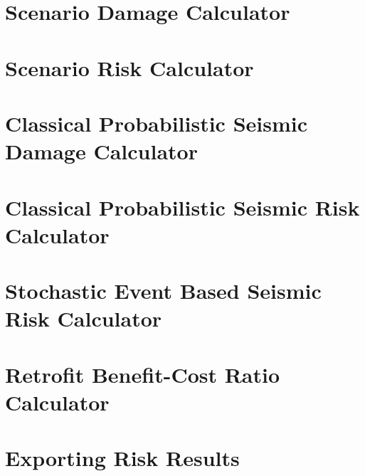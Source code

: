 \section{Scenario Damage Calculator}
\label{sec:config_scenario_damage}


\section{Scenario Risk Calculator}
\label{sec:config_scenario_risk}


\section{Classical Probabilistic Seismic Damage Calculator}
\label{sec:config_classical_damage}


\section{Classical Probabilistic Seismic Risk Calculator}
\label{sec:config_classical_risk}


\section{Stochastic Event Based Seismic Risk Calculator}
\label{sec:config_event_based_risk}


\section{Retrofit Benefit-Cost Ratio Calculator}
\label{sec:config_benefit_cost}


\section{Exporting Risk Results}
\label{sec:risk_export}



\cleardoublepage
